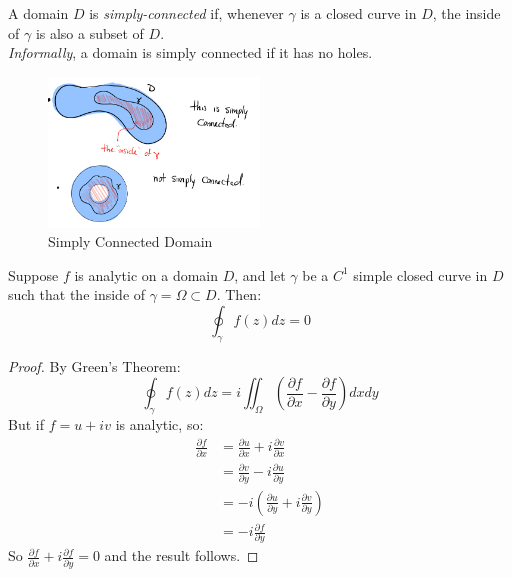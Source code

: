 \begin{definition}
    A domain $D$ is \textit{simply-connected} if, whenever $\gamma$ is a closed curve in $D$, the inside of $\gamma$ is also a subset of $D$. \\
    \textit{Informally}, a domain is simply connected if it has no holes.
\end{definition}

\begin{figure}[H]
    \centering
    \includegraphics[width=0.5\textwidth]{LECTURE_7/simply-connected.png}
    \caption{Simply Connected Domain}
\end{figure}

\begin{theorem}
    Suppose $f$ is analytic on a domain $D$, and let $\gamma$ be a $C^1$ simple closed curve in $D$ such that the inside of $\gamma = \Omega \subset D$. Then:
    $$\oint_{\gamma} f(z) dz = 0$$
\end{theorem}

\begin{proof}
    By Green's Theorem:
    $$\oint_{\gamma} f(z) dz = i\iint_{\Omega} \left(\frac{\partial f}{\partial x} - \frac{\partial f}{\partial y}\right) dxdy$$
    But if $f = u + iv$ is analytic, so:
    \begin{align*}
        \frac{\partial f}{\partial x} & = \frac{\partial u}{\partial x} + i \frac{\partial v}{\partial x}                 \\
                                      & = \frac{\partial v}{\partial y} - i \frac{\partial u}{\partial y}                 \\
                                      & = -i \left(\frac{\partial u}{\partial y} + i \frac{\partial v}{\partial y}\right) \\
                                      & = -i \frac{\partial f}{\partial y}
    \end{align*}
    So $\frac{\partial f}{\partial x} + i \frac{\partial f}{\partial y} = 0$ and the result follows.
\end{proof}

